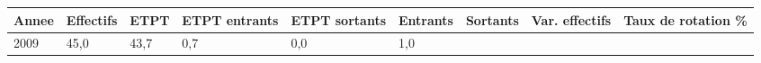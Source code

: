\begin{longtable}[]{@{}lllllllll@{}}
\toprule
\begin{minipage}[b]{0.05\columnwidth}\raggedright
Annee\strut
\end{minipage} & \begin{minipage}[b]{0.08\columnwidth}\raggedright
Effectifs\strut
\end{minipage} & \begin{minipage}[b]{0.04\columnwidth}\raggedright
ETPT\strut
\end{minipage} & \begin{minipage}[b]{0.10\columnwidth}\raggedright
ETPT entrants\strut
\end{minipage} & \begin{minipage}[b]{0.10\columnwidth}\raggedright
ETPT sortants\strut
\end{minipage} & \begin{minipage}[b]{0.07\columnwidth}\raggedright
Entrants\strut
\end{minipage} & \begin{minipage}[b]{0.07\columnwidth}\raggedright
Sortants\strut
\end{minipage} & \begin{minipage}[b]{0.11\columnwidth}\raggedright
Var. effectifs\strut
\end{minipage} & \begin{minipage}[b]{0.14\columnwidth}\raggedright
Taux de rotation \%\strut
\end{minipage}\tabularnewline
\midrule
\endhead
\begin{minipage}[t]{0.05\columnwidth}\raggedright
2009\strut
\end{minipage} & \begin{minipage}[t]{0.08\columnwidth}\raggedright
45,0\strut
\end{minipage} & \begin{minipage}[t]{0.04\columnwidth}\raggedright
43,7\strut
\end{minipage} & \begin{minipage}[t]{0.10\columnwidth}\raggedright
0,7\strut
\end{minipage} & \begin{minipage}[t]{0.10\columnwidth}\raggedright
0,0\strut
\end{minipage} & \begin{minipage}[t]{0.07\columnwidth}\raggedright
1,0\strut
\end{minipage} & \begin{minipage}[t]{0.07\columnwidth}\raggedright

\end{minipage}
\end{longtable}
